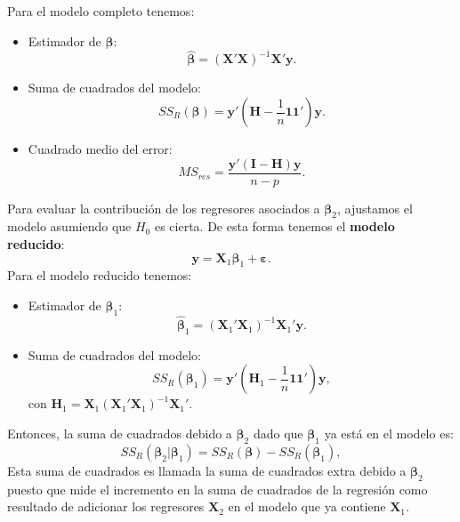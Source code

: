 \documentclass[
]{article}
\providecommand{\tightlist}{%
  \setlength{\itemsep}{0pt}\setlength{\parskip}{0pt}}
\begin{document}
Para el modelo completo tenemos:

\begin{itemize}
\tightlist
\item
  Estimador de \(\boldsymbol \beta\):
  \[
  \widehat{\boldsymbol \beta}= (\boldsymbol X'\boldsymbol X)^{-1}\boldsymbol X'\boldsymbol y.
  \]
\item
  Suma de cuadrados del modelo:
  \[
  SS_{R}(\boldsymbol \beta) = \boldsymbol y'(\boldsymbol H- \frac{1}{n}\boldsymbol 1\boldsymbol 1')\boldsymbol y.
  \]
\item
  Cuadrado medio del error:
  \[
  MS_{res} = \frac{\boldsymbol y'(\boldsymbol I- \boldsymbol H)\boldsymbol y}{n-p}.
  \]
\end{itemize}

Para evaluar la contribución de los regresores asociados a \(\boldsymbol \beta_{2}\), ajustamos el modelo asumiendo que \(H_{0}\) es cierta. De esta forma tenemos el \textbf{modelo reducido}:
\[
\boldsymbol y= \boldsymbol X_{1}\boldsymbol \beta_{1} + \boldsymbol \varepsilon.
\]
Para el modelo reducido tenemos:

\begin{itemize}
\tightlist
\item
  Estimador de \(\boldsymbol \beta_{1}\):
  \[
  \widehat{\boldsymbol \beta}_{1} = (\boldsymbol X_{1}'\boldsymbol X_{1})^{-1}\boldsymbol X_{1}'\boldsymbol y.
  \]
\item
  Suma de cuadrados del modelo:
  \[
  SS_{R}(\boldsymbol \beta_{1}) = \boldsymbol y'(\boldsymbol H_1 - \frac{1}{n}\boldsymbol 1\boldsymbol 1')\boldsymbol y,
  \]
  con \(\boldsymbol H_1 = \boldsymbol X_1(\boldsymbol X_1'\boldsymbol X_1)^{-1}\boldsymbol X_1'\).
\end{itemize}

Entonces, la suma de cuadrados debido a \(\boldsymbol \beta_{2}\) dado que \(\boldsymbol \beta_{1}\) ya está en el modelo es:
\[
SS_{R}(\boldsymbol \beta_{2}| \boldsymbol \beta_{1}) = SS_{R}(\boldsymbol \beta) - SS_{R}(\boldsymbol \beta_{1}),
\]
Esta suma de cuadrados es llamada la suma de cuadrados extra debido a \(\boldsymbol \beta_2\) puesto que mide el incremento en la suma de cuadrados de la regresión como resultado de adicionar los regresores \(\boldsymbol X_{2}\) en el modelo que ya contiene \(\boldsymbol X_{1}\).
\end{document}
